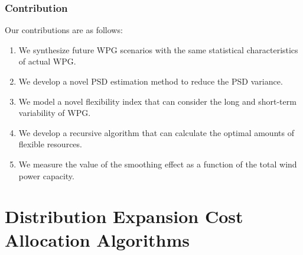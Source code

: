 \documentclass[journal]{IEEEtran} %
\begin{document}







\subsubsection{Contribution}

Our contributions are as follows:
\begin{enumerate}	
	\item We synthesize future WPG scenarios with the same statistical characteristics of actual WPG.
	\item We develop a novel PSD estimation method to reduce the PSD variance.	
	\item We model a novel flexibility index that can consider the long and short-term variability of WPG.	
	\item We develop a recursive algorithm that can calculate the optimal amounts of flexible resources.
	\item We measure the value of the smoothing effect as a function of the total wind power capacity.
\end{enumerate}

























\newpage
\section{Distribution Expansion Cost Allocation Algorithms}
\end{document}
